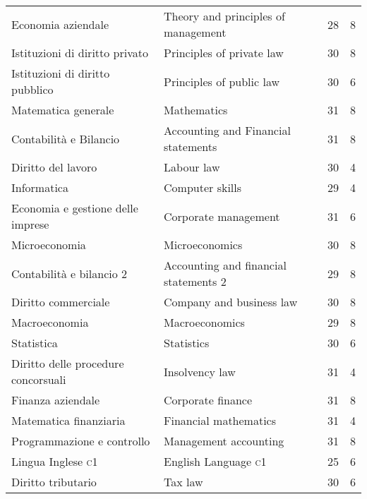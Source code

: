 \documentclass[a4paper,10pt]{article}
\begin{document}
	\begin{center}
		
		\tabletail{%
		}
		\tablelasttail{}	
		
		\begin{supertabular}{p{4.9cm} p{4.9cm} c c}
			Economia aziendale&Theory and principles of management& 28 & 8\\
			Istituzioni di diritto privato&Principles of private law&30&8\\
			Istituzioni di diritto pubblico 
			&
			Principles of public law 
			& 30&
			6 
			\\
			Matematica generale 
			& Mathematics 
			&31&8\\
			Contabilit\`a e Bilancio 
			& Accounting and Financial statements 
			& 31 & 8\\
			Diritto del lavoro 
			&
			Labour law 
			& 30&
			4 
			\\
			Informatica & Computer skills &29& 4 
			\\
			Economia e gestione delle imprese & Corporate management &31&6 
			\\
			Microeconomia & Microeconomics &30&8 
			\\
			Contabilit\`a e bilancio 2 & Accounting and financial statements 2 
			&29&8 \\
			Diritto commerciale & Company and business law &30&8 
			\\
			Macroeconomia & Macroeconomics &29&8 
			\\
			Statistica & Statistics &30&6\\
			Diritto delle procedure concorsuali & Insolvency law &31&4 
			\\
			Finanza aziendale 
			& Corporate finance 
			&31 &8 \\
			Matematica finanziaria & Financial mathematics &31&4 
			\\
			Programmazione e controllo 
			& Management accounting &31&8 
			\\
			Lingua Inglese \textsc{c1}& English Language \textsc{c1}& 25&6\\ 
			Diritto tributario & Tax law &30&6 
			\\

\end{supertabular}
\end{center}
\end{document}
